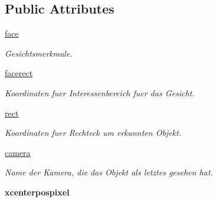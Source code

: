 \subsection*{Public Attributes}
\begin{DoxyCompactItemize}
\item 
\hypertarget{classpeople2pose_1_1Person_a1069e58624090e6b9e6d3857e0b41321}{\hyperlink{classpeople2pose_1_1Person_a1069e58624090e6b9e6d3857e0b41321}{face}}\label{classpeople2pose_1_1Person_a1069e58624090e6b9e6d3857e0b41321}

\begin{DoxyCompactList}\small\item\em Gesichtsmerkmale. \end{DoxyCompactList}\item 
\hypertarget{classpeople2pose_1_1Person_a907fa30e17c3beeacb135486eb23d386}{\hyperlink{classpeople2pose_1_1Person_a907fa30e17c3beeacb135486eb23d386}{facerect}}\label{classpeople2pose_1_1Person_a907fa30e17c3beeacb135486eb23d386}

\begin{DoxyCompactList}\small\item\em Koordinaten fuer Interessenbereich fuer das Gesicht. \end{DoxyCompactList}\item 
\hypertarget{classpeople2pose_1_1Person_a91d215e14349d834dca33490bd27f41e}{\hyperlink{classpeople2pose_1_1Person_a91d215e14349d834dca33490bd27f41e}{rect}}\label{classpeople2pose_1_1Person_a91d215e14349d834dca33490bd27f41e}

\begin{DoxyCompactList}\small\item\em Koordinaten fuer Rechteck um erkannten Objekt. \end{DoxyCompactList}\item 
\hypertarget{classpeople2pose_1_1Person_a99eb500b78bc3ca6f7fdbdb92c8483c1}{\hyperlink{classpeople2pose_1_1Person_a99eb500b78bc3ca6f7fdbdb92c8483c1}{camera}}\label{classpeople2pose_1_1Person_a99eb500b78bc3ca6f7fdbdb92c8483c1}

\begin{DoxyCompactList}\small\item\em Name der Kamera, die das Objekt als letztes gesehen hat. \end{DoxyCompactList}\item 
\hypertarget{classpeople2pose_1_1Person_ad875b95fc49a9494f2d433373e14faba}{{\bfseries xcenterpospixel}}\label{classpeople2pose_1_1Person_ad875b95fc49a9494f2d433373e14faba}


\end{DoxyCompactItemize}
